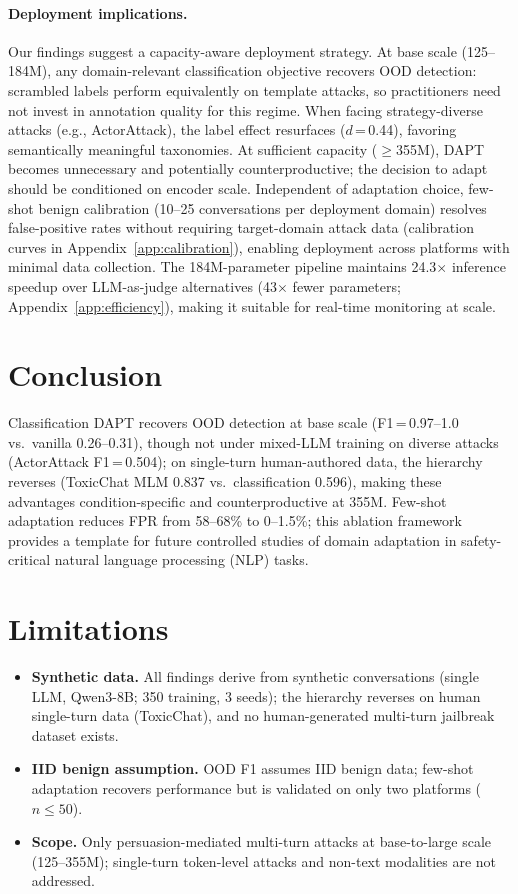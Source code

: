 \paragraph{Deployment implications.}
Our findings suggest a capacity-aware deployment strategy. At base scale (125--184M), any domain-relevant classification objective recovers OOD detection: scrambled labels perform equivalently on template attacks, so practitioners need not invest in annotation quality for this regime. When facing strategy-diverse attacks (e.g., ActorAttack), the label effect resurfaces ($d$\,=\,0.44), favoring semantically meaningful taxonomies. At sufficient capacity ($\geq$355M), DAPT becomes unnecessary and potentially counterproductive; the decision to adapt should be conditioned on encoder scale. Independent of adaptation choice, few-shot benign calibration (10--25 conversations per deployment domain) resolves false-positive rates without requiring target-domain attack data (calibration curves in Appendix~\ref{app:calibration}), enabling deployment across platforms with minimal data collection. The 184M-parameter pipeline maintains 24.3$\times$ inference speedup over LLM-as-judge alternatives (43$\times$ fewer parameters; Appendix~\ref{app:efficiency}), making it suitable for real-time monitoring at scale.

\section{Conclusion}

Classification DAPT recovers OOD detection at base scale (F1\,=\,0.97--1.0 vs.\ vanilla 0.26--0.31), though not under mixed-LLM training on diverse attacks (ActorAttack F1\,=\,0.504); on single-turn human-authored data, the hierarchy reverses (ToxicChat MLM 0.837 vs.\ classification 0.596), making these advantages condition-specific and counterproductive at 355M. Few-shot adaptation reduces FPR from 58--68\% to 0--1.5\%; this ablation framework provides a template for future controlled studies of domain adaptation in safety-critical natural language processing (NLP) tasks.

\section{Limitations}
\label{sec:limitations}

\begin{itemize}[nosep,leftmargin=*]
\item \textbf{Synthetic data.} All findings derive from synthetic conversations (single LLM, Qwen3-8B; 350 training, 3 seeds); the hierarchy reverses on human single-turn data (ToxicChat), and no human-generated multi-turn jailbreak dataset exists.
\item \textbf{IID benign assumption.} OOD F1 assumes IID benign data; few-shot adaptation recovers performance but is validated on only two platforms ($n \leq 50$).
\item \textbf{Scope.} Only persuasion-mediated multi-turn attacks at base-to-large scale (125--355M); single-turn token-level attacks and non-text modalities are not addressed.
\end{itemize}
